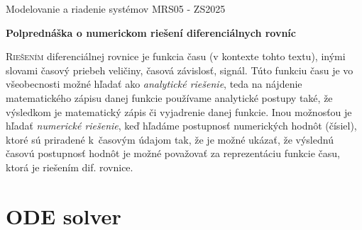 \documentclass[a4paper, 10pt, ]{article}
\def\oznacenieCasti{MRS05 - ZS2025}
\begin{document}
\lstset{%
style=mystyle,
rangebeginprefix=\#\#\#\ cellB\ ,%
rangebeginsuffix=\ \#\#\#,%
rangeendprefix=\#\#\#\ cellE\ ,%
rangeendsuffix=\ \#\#\#,%
includerangemarker=false,
}





\fontsize{12pt}{22pt}\selectfont

\centerline{\textsf{Modelovanie a riadenie systémov} \hfill \textsf{\oznacenieCasti}}

\fontsize{18pt}{22pt}\selectfont





\begin{flushleft}
	\textbf{\textsf{Polprednáška o numerickom riešení diferenciálnych rovníc}}
\end{flushleft}





\normalsize

\bigskip

{\hypersetup{hidelinks}

\tableofcontents

}

\bigskip

\vspace{18pt}



\noindent
\lettrine[lines=3, nindent=0pt]{R}{iešením} diferenciálnej rovnice je funkcia času (v kontexte tohto textu), inými slovami časový priebeh veličiny, časová závislosť, signál. Túto funkciu času je vo všeobecnosti možné hľadať ako \emph{analytické riešenie}, teda na nájdenie matematického zápisu danej funkcie používame analytické postupy také, že výsledkom je matematický zápis či vyjadrenie danej funkcie. Inou možnosťou je hľadať \emph{numerické riešenie}, keď hľadáme postupnosť numerických hodnôt (čísiel), ktoré sú priradené k~časovým údajom tak, že je možné ukázať, že výslednú časovú postupnosť hodnôt je možné považovať za reprezentáciu funkcie času, ktorá je riešením dif. rovnice.












\section{ODE solver}
\end{document}
